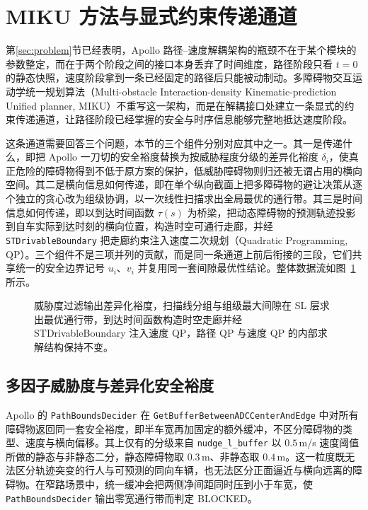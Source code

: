 \documentclass[a4paper,11pt]{ctexart}
\theoremstyle{definition}
\begin{document}

\section{MIKU 方法与显式约束传递通道}
\label{sec:method}

第\ref{sec:problem}节已经表明，Apollo 路径--速度解耦架构的瓶颈不在于某个模块的参数整定，而在于两个阶段之间的接口本身丢弃了时间维度，路径阶段只看 $t=0$ 的静态快照，速度阶段拿到一条已经固定的路径后只能被动制动。多障碍物交互运动学统一规划算法（Multi-obstacle Interaction-density Kinematic-prediction Unified planner, MIKU）不重写这一架构，而是在解耦接口处建立一条显式的约束传递通道，让路径阶段已经掌握的安全与时序信息能够完整地抵达速度阶段。

这条通道需要回答三个问题，本节的三个组件分别对应其中之一。其一是传递什么，即把 Apollo 一刀切的安全裕度替换为按威胁程度分级的差异化裕度 $\delta_i$，使真正危险的障碍物得到不低于原方案的保护，低威胁障碍物则归还被无谓占用的横向空间。其二是横向信息如何传递，即在单个纵向截面上把多障碍物的避让决策从逐个独立的贪心改为组级协调，以一次线性扫描求出全局最优的通行带。其三是时间信息如何传递，即以到达时间函数 $\tau(s)$ 为桥梁，把动态障碍物的预测轨迹投影到自车实际到达时刻的横向位置，构造时空可通行走廊，并经 \texttt{STDrivableBoundary} 把走廊约束注入速度二次规划（Quadratic Programming, QP）。三个组件不是三项并列的贡献，而是同一条通道上前后衔接的三段，它们共享统一的安全边界记号 $u_i$、$v_i$ 并复用同一套间隙最优性结论。整体数据流如图~\ref{fig:algorithm_flow} 所示。

\begin{figure}[htbp]
\centering
{}
\caption{MIKU 显式约束传递通道的整体数据流}
\caption*{威胁度过滤输出差异化裕度，扫描线分组与组级最大间隙在 SL 层求出最优通行带，到达时间函数构造时空走廊并经 STDrivableBoundary 注入速度 QP，路径 QP 与速度 QP 的内部求解结构保持不变。}
\label{fig:algorithm_flow}
\end{figure}

\subsection{多因子威胁度与差异化安全裕度}
\label{sec:method_threat}

Apollo 的 \texttt{PathBoundsDecider} 在 \texttt{GetBufferBetweenADCCenterAndEdge} 中对所有障碍物返回同一套安全裕度，即半车宽再加固定的额外缓冲，不区分障碍物的类型、速度与横向偏移。其上仅有的分级来自 \texttt{nudge\_l\_buffer} 以 $0.5$\,m/s 速度阈值所做的静态与非静态二分，静态障碍物取 $0.3$\,m、非静态取 $0.4$\,m。这一粒度既无法区分轨迹突变的行人与可预测的同向车辆，也无法区分正面逼近与横向远离的障碍物。在窄路场景中，统一缓冲会把两侧净间距同时压到小于车宽，使 \texttt{PathBoundsDecider} 输出零宽通行带而判定 BLOCKED。
\end{document}
